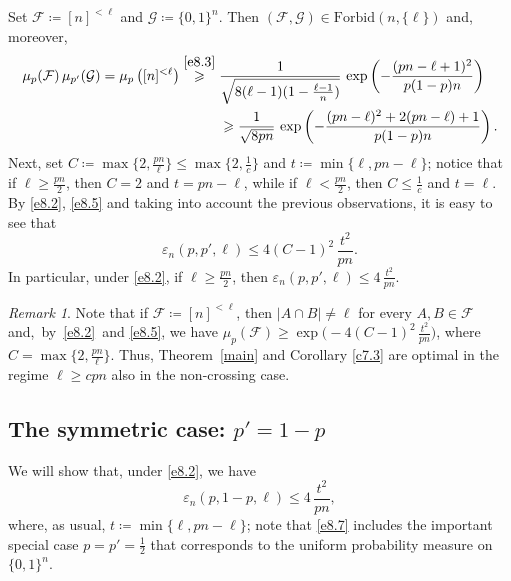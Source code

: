 \documentclass[10pt,a4paper]{amsart}
\theoremstyle{remark}
\newtheorem{rem}[thm]{Remark}
\newcommand{\ee}{\varepsilon}
\newcommand{\meg}{\geqslant}
\newcommand{\mik}{\leqslant}
\newcommand{\Fcal}{\mathcal{F}}
\newcommand{\Gcal}{\mathcal{G}}
\begin{document}
Set $\Fcal\coloneqq [n]^{<\ell}$ and $\Gcal\coloneqq \{0,1\}^n$. Then
$(\Fcal,\Gcal)\in \mathrm{Forbid}(n,\{\ell\})$ and, moreover,
\begin{align} \label{e8.5}
\mu_p(\Fcal)\, \mu_{p'}(\Gcal) =\mu_p\left([n]^{<\ell}\right)	
& \stackrel{\eqref{e8.3}}{\meg}
\frac{1}{\sqrt{8(\ell-1)(1-\frac{\ell-1}{n})}}\, \exp\left(-\frac{(pn-\ell+1)^2}{p(1-p)n}\right)\\
& \hspace{1cm} \meg \frac{1}{\sqrt{8pn}}\, \exp\left(-\frac{(pn-\ell)^2+2(pn-\ell)+1}{p(1-p)n}\right). \nonumber
\end{align}
Next, set $C\coloneqq \max\{2,\frac{pn}{\ell}\} \mik \max\{2,\frac{1}{c}\}$ and $t\coloneqq \min\{\ell,pn-\ell\}$;
notice that if $\ell\meg \frac{pn}{2}$, then $C=2$ and $t=pn-\ell$, while if $\ell<\frac{pn}{2}$, then
$C\mik \frac{1}{c}$ and $t=\ell$. By \eqref{e8.2}, \eqref{e8.5} and taking into account the previous
observations, it is easy to see that
\begin{equation} \label{e8.6}
\ee_n(p,p',\ell) \mik 4(C-1)^2\, \frac{t^2}{pn}.
\end{equation}
In particular, under \eqref{e8.2}, if $\ell\meg \frac{pn}{2}$, then
$\ee_n(p,p',\ell) \mik 4\, \frac{t^2}{pn}$.
\begin{rem} \label{r8.2}
Note that if $\mathcal{F}\coloneqq [n]^{<\ell}$, then $|A\cap B|\neq\ell$ for every
$A,B\in\mathcal{F}$ and,~by~\eqref{e8.2}~and \eqref{e8.5}, we have
$\mu_p(\mathcal{F})\meg \exp\big(- 4(C-1)^2\, \frac{t^2}{pn}\big)$, where $C= \max\{2,\frac{pn}{\ell}\}$.
Thus, Theorem~\ref{main} and Corollary \ref{c7.3} are optimal in the regime
$\ell\meg cpn$ also in the non-crossing case.
\end{rem}

\subsection{The symmetric case: $p'=1-p$} \label{subsec8.2}

We will show that, under \eqref{e8.2}, we have
\begin{equation} \label{e8.7}
\ee_n(p,1-p,\ell) \mik 4\, \frac{t^2}{pn},
\end{equation}
where, as usual, $t\coloneqq \min\{\ell,pn-\ell\}$; note that \eqref{e8.7} includes the important special
case $p=p'=\frac12$ that corresponds to the uniform probability measure on $\{0,1\}^n$.
\end{document}
